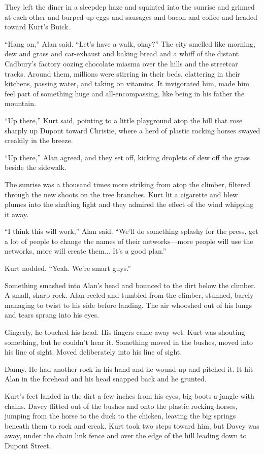 \documentclass{article}
\begin{document}
They left the diner in a sleepdep haze and squinted into the sunrise
and grinned at each other and burped up eggs and sausages and bacon
and coffee and headed toward Kurt's Buick.

``Hang on,'' Alan said.  ``Let's have a walk, okay?'' The city smelled
like morning, dew and grass and car-exhaust and baking bread and a
whiff of the distant Cadbury's factory oozing chocolate miasma over
the hills and the streetcar tracks.  Around them, millions were
stirring in their beds, clattering in their kitchens, passing water,
and taking on vitamins.  It invigorated him, made him feel part of
something huge and all-encompassing, like being in his father the
mountain.

``Up there,'' Kurt said, pointing to a little playground atop the hill
that rose sharply up Dupont toward Christie, where a herd of plastic
rocking horses swayed creakily in the breeze.

``Up there,'' Alan agreed, and they set off, kicking droplets of dew
off the grass beside the sidewalk.

The sunrise was a thousand times more striking from atop the climber,
filtered through the new shoots on the tree branches.  Kurt lit a
cigarette and blew plumes into the shafting light and they admired the
effect of the wind whipping it away.

``I think this will work,'' Alan said.  ``We'll do something splashy
for the press, get a lot of people to change the names of their
networks---more people will use the networks, more will create them... 
It's a good plan.''

Kurt nodded.  ``Yeah.  We're smart guys.''

Something smashed into Alan's head and bounced to the dirt below the
climber.  A small, sharp rock.  Alan reeled and tumbled from the
climber, stunned, barely managing to twist to his side before landing. 
The air whooshed out of his lungs and tears sprang into his eyes.

Gingerly, he touched his head.  His fingers came away wet.  Kurt was
shouting something, but he couldn't hear it.  Something moved in the
bushes, moved into his line of sight.  Moved deliberately into his
line of sight.

Danny.  He had another rock in his hand and he wound up and pitched
it.  It hit Alan in the forehead and his head snapped back and he
grunted.

Kurt's feet landed in the dirt a few inches from his eyes, big boots
a-jangle with chains.  Davey flitted out of the bushes and onto the
plastic rocking-horses, jumping from the horse to the duck to the
chicken, leaving the big springs beneath them to rock and creak.  Kurt
took two steps toward him, but Davey was away, under the chain link
fence and over the edge of the hill leading down to Dupont Street.
\end{document}
